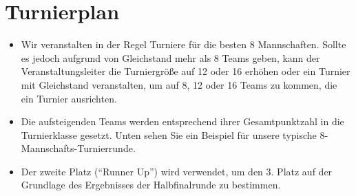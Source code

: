 \documentclass[a4paper,12pt]{article}
\begin{document}
\section{Turnierplan}
\begin{itemize}
	\item Wir veranstalten in der Regel Turniere für die besten 8 Mannschaften. Sollte es jedoch aufgrund von Gleichstand mehr als 8 Teams geben, kann der Veranstaltungsleiter die Turniergröße auf 12 oder 16 erhöhen oder ein Turnier mit Gleichstand veranstalten, um auf 8, 12 oder 16 Teams zu kommen, die ein Turnier ausrichten.
	\item Die aufsteigenden Teams werden entsprechend ihrer Gesamtpunktzahl in die Turnierklasse gesetzt. Unten sehen Sie ein Beispiel für unsere typische 8-Mannschafts-Turnierrunde.
        \item Der zweite Platz ("`Runner Up"') wird verwendet, um den 3. Platz auf der Grundlage des Ergebnisses der Halbfinalrunde zu bestimmen.
\end{itemize}
\begin{figure}[H]
    \centering
    \def\svgwidth{\columnwidth}
    
\end{figure}
\end{document}
